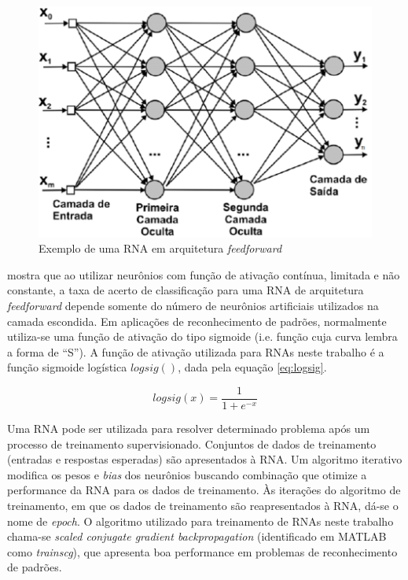 \begin{figure}[htb]
	\caption{\label{fig:feedforward} Exemplo de uma RNA em arquitetura \emph{feedforward}}
	\begin{center}
	    \includegraphics[width=0.75\linewidth]{./img/feedforward.png}
	\end{center}
\end{figure}

\cite{Hornik1991} mostra que ao utilizar neurônios com função de ativação contínua, limitada e não constante, a taxa de acerto de classificação para uma RNA de arquitetura \emph{feedforward} depende somente do número de neurônios artificiais utilizados na camada escondida. Em aplicações de reconhecimento de padrões, normalmente utiliza-se uma função de ativação do tipo sigmoide (i.e. função cuja curva lembra a forma de ``S'').  A função de ativação utilizada para RNAs neste trabalho é a função sigmoide logística $logsig()$, dada pela equação \ref{eq:logsig}.

\begin{equation}
\label{eq:logsig}
	logsig(x) = \frac{1}{1+e^{-x}}
\end{equation}

Uma RNA pode ser utilizada para resolver determinado problema após um processo de treinamento supervisionado. Conjuntos de dados de treinamento (entradas e respostas esperadas) são apresentados à RNA. Um algoritmo iterativo modifica os pesos e \emph{bias} dos neurônios buscando combinação que otimize a performance da RNA para os dados de treinamento. Às iterações do algoritmo de treinamento, em que os dados de treinamento são reapresentados à RNA, dá-se o nome de \emph{epoch}. O algoritmo utilizado para treinamento de RNAs neste trabalho chama-se \emph{scaled conjugate gradient backpropagation} \cite{Moller1993} (identificado em MATLAB como \emph{trainscg}), que apresenta boa performance em problemas de reconhecimento de padrões.

